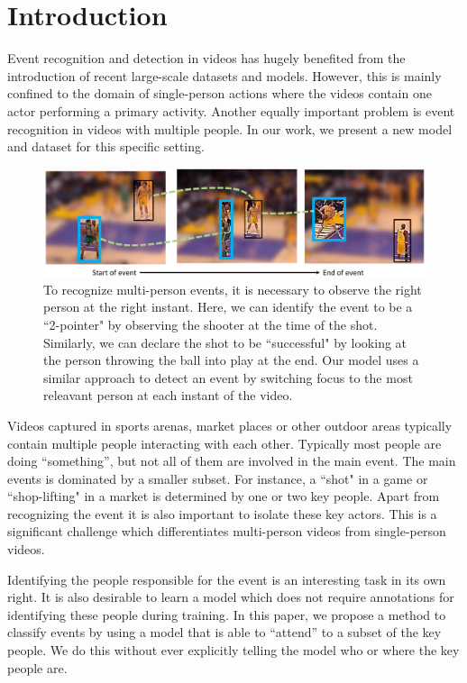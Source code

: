 \section{Introduction}

Event recognition and detection in videos has hugely benefited from the
introduction of recent large-scale datasets \cite{THUMOS,UCF101,Karpathy_CVPR14,MED11} and models.
However, this is mainly confined to the domain of single-person actions
where the videos contain one actor performing a primary activity.
Another equally important problem is event recognition in
videos with multiple people. In our work, we present a new model
and dataset for this specific setting.

\begin{figure}[ht!]
\begin{center}
  \includegraphics[width=3.5 in]{images/pull_figure_v2_cropped.pdf}
\end{center}
\caption{To recognize multi-person events, it is necessary to observe the right
person at the right instant. Here, we can identify the
event to be a ``2-pointer" by observing the shooter at the time of the shot.
Similarly, we can declare the shot to be ``successful" by looking at the
person throwing the ball into play at the end. Our model uses a similar approach to detect
an event by switching focus to the most releavant person at each instant of the video.}
\label{fig:pull_figure}
\end{figure}

Videos captured in sports arenas, market places or other outdoor areas
typically contain multiple people interacting with each other.
Typically most people are doing ``something'', but not all of them are involved in the main event.
The main events is dominated by a smaller subset. For instance, a ``shot" in a game
or ``shop-lifting" in a market is determined by one or two key people.
Apart from recognizing the event it is also important
to isolate these key actors. This is a significant challenge which
differentiates multi-person videos from single-person videos.

Identifying the people responsible for the event is an interesting task in its
own right.  It is also desirable to learn a model which does not require
annotations for identifying these people during training. In this paper, we
propose a method  to classify events by using a model that is able to
``attend'' to a subset of the key people.  We  do this without ever explicitly
telling the model who or where the key people are. 

